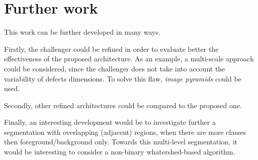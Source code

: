 \section{Further work}\label{section:further-work}
    \par{
        This work can be further developed in many ways.
    }
    \par{
        Firstly, the challenger could be refined in order to evaluate better the effectiveness of the proposed architecture. As an example, a multi-scale approach could be considered, since the challenger does not take into account the variability of defects dimensions. To solve this flaw, \emph{image pyramids} could be used.
    }
    \par{
        Secondly, other refined architectures could be compared to the proposed one.
    }
    \par{
        Finally, an interesting development would be to investigate further a segmentation with overlapping (adjacent) regions, when there are more classes then foreground/background only. Towards this multi-level segmentation, it would be interesting to consider a non-binary whatershed-based algorithm.
    }